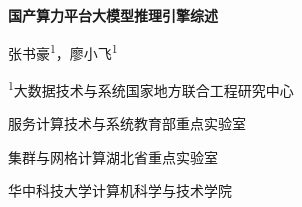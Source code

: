 \documentclass[UTF8,a4paper,12pt]{ctexart}
\begin{document}
\begin{center}
{\bfseries{} 国产算力平台大模型推理引擎综述\par}
\vspace{0.95em}
{ 张书豪\textsuperscript{1}，廖小飞\textsuperscript{1}\par}
\vspace{0.45em}
{ \textsuperscript{1}大数据技术与系统国家地方联合工程研究中心\par}
{ 服务计算技术与系统教育部重点实验室\par}
{ 集群与网格计算湖北省重点实验室\par}
{ 华中科技大学计算机科学与技术学院\par}
\end{center}

\renewcommand{\thefootnote}{\fnsymbol{footnote}}
\renewcommand{\thefootnote}{\arabic{footnote}}

\vspace{0.6em}
\end{document}
